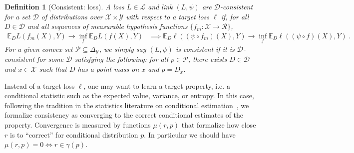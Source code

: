 \documentclass[11pt]{article} %
\newcommand{\Comments}{1}
\newcommand{\mynote}[2]{\ifnum\Comments=1\textcolor{#1}{#2}\fi}
\newcommand{\mytodo}[2]{\ifnum\Comments=1%
	\todo[linecolor=#1!80!black,backgroundcolor=#1,bordercolor=#1!80!black]{#2}\fi}
\newcommand{\raft}[1]{\mytodo{green!20!white}{RF: #1}}
\newcommand{\jessie}[1]{\mynote{purple}{[JF: #1]}}
\newcommand{\botodo}[1]{\mytodo{blue!20!white}{[Bo: #1]}}
\newcommand{\btw}[1]{}%
\newcommand{\reals}{\mathbb{R}}
\newcommand{\simplex}{\Delta_\Y}
\newcommand{\propdis}{\mu}
\newcommand{\D}{\mathcal{D}}
\newcommand{\E}{\mathbb{E}}
\renewcommand{\L}{\mathcal{L}}
\newcommand{\R}{\mathcal{R}}
\renewcommand{\P}{\mathcal{P}}
\newcommand{\X}{\mathcal{X}}
\newcommand{\Y}{\mathcal{Y}}
\newcommand{\Ind}[1]{\mathbf{I}\{{#1}\}}
\newtheorem{definition}{Definition}
\begin{document}
\begin{definition}[Consistent: loss]\label{def:consistent-ell}
	A loss $L \in \L$ and link $(L,\psi)$ are \emph{$\D$-consistent} for a set $\D$ of distributions over $\X \times \Y$ with respect to a target loss $\ell$ if, for all $D \in \D$ and all sequences of measurable hypothesis functions $\{f_m : \X \to \R\}$,
	\begin{align*}
	\E_D L(f_m(X), Y) \to \inf_f \E_D L(f(X), Y) &\implies \E_D \ell((\psi \circ f_m)(X), Y) \to \inf_f \E_D \ell((\psi \circ f)(X), Y)~.~
	\end{align*}
	For a given convex set $\P \subseteq \simplex$, we simply say $(L,\psi)$ is \emph{consistent} if it is $\D$-consistent for some $\D$ satisfying the following: for all $p \in \P$, there exists $D \in \D$ and $x \in \X$ such that $D$ has a point mass on $x$ and $p = D_x$.
\end{definition}




Instead of a target loss $\ell$, one may want to learn a target property, i.e. a conditional statistic such as the expected value, variance, or entropy.
In this case, following the tradition in the statistics literature on conditional estimation~\citep{gyorfi2006distribution,fan1998efficient,ruppert1997local},
we formalize consistency as converging to the correct conditional estimates of the property.
Convergence is measured by functions $\propdis(r, p)$ that formalize how close $r$ is to ``correct'' for conditional distribution $p$.
In particular we should have $\propdis(r,p) = 0 \iff r \in \gamma(p)$.
\btw{Bo: Would be nice to give some natural special cases: for a finite property, $\propdis(r,p) = \Ind{r \in \gamma(p)}$, and for single-valued properties with a distance metric on $\R$, $\propdis(r,p) = \text{dist}(r, \gamma(p))$.}
\end{document}
